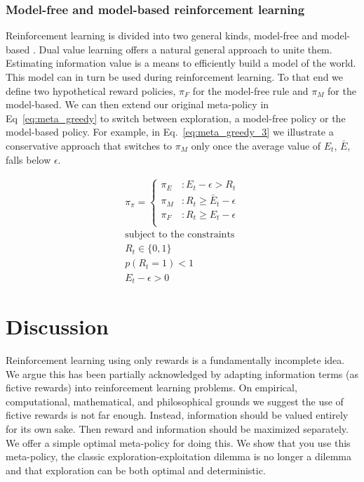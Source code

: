 \documentclass[9pt,twocolumn,twoside]{pnas-new}
\begin{document}
\subsubsection*{Model-free and model-based reinforcement learning}
Reinforcement learning is divided into two general kinds, model-free and model-based \cite{Sutton2018}. %
Dual value learning offers a natural general approach to unite them. Estimating information value is a means to efficiently build a model of the world. This model can in turn be used during reinforcement learning. To that end we define two hypothetical reward policies, $\pi_F$ for the model-free rule and $\pi_M$ for the model-based.  We can then extend our original meta-policy in Eq~\ref{eq:meta_greedy} to switch between exploration, a model-free policy or the model-based policy. For example, in Eq.~\ref{eq:meta_greedy_3} we illustrate a conservative approach that switches to $\pi_M$ only once the average value of $E_t$, $\bar E$, falls below $\epsilon$.

\begin{equation} \label{eq:meta_greedy_3}
    \begin{split}
        \pi_{\pi} = 
        \begin{cases}
            \pi_E & : E_t - \epsilon > R_t \\
            \pi_M & : R_t \geq \bar E_t - \epsilon \\
            \pi_F & : R_t \geq E_t - \epsilon \\
        \end{cases}\\
        \text{subject to the constraints}\\
        R_t \in \{0, 1\}\\ 
        p(R_t = 1) < 1\\
        E_t - \epsilon > 0
    \end{split}
\end{equation}


\section*{Discussion}
Reinforcement learning using only rewards is a fundamentally incomplete idea. We argue this has been partially acknowledged by adapting information terms (as fictive rewards) into reinforcement learning problems. On empirical, computational, mathematical, and philosophical grounds we suggest the use of fictive rewards is not far enough. Instead, information should be valued entirely for its own sake. Then reward and information should be maximized separately. We offer a simple optimal meta-policy for doing this. We show that you use this meta-policy, the classic exploration-exploitation dilemma is no longer a dilemma and that exploration can be both optimal and deterministic.
\end{document}
